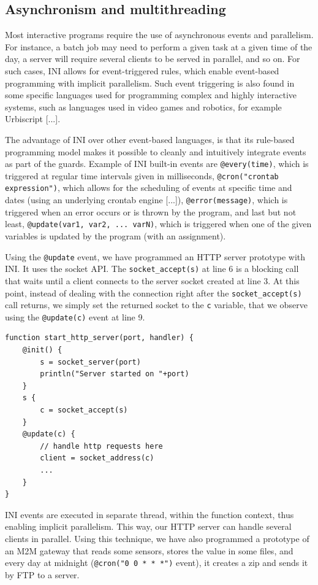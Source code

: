 \documentclass{sig-alternate}
\begin{document}
\subsection{Asynchronism and multithreading}

Most interactive programs require the use of asynchronous events and parallelism. For instance, a batch job may need to perform a given task at a given time of the day, a server will require several clients to be served in parallel, and so on. For such cases, INI allows for event-triggered rules, which enable event-based programming with implicit parallelism. Such event triggering is also found in some specific languages used for programming complex and highly interactive systems, such as languages used in video games and robotics, for example Urbiscript [...]. 

The advantage of INI over other event-based languages, is that its rule-based programming model makes it possible to cleanly and intuitively integrate events as part of the guards. Example of INI built-in events are \texttt{@every(time)}, which is triggered at regular time intervals given in milliseconds, \texttt{@cron("crontab expression")}, which allows for the scheduling of events at specific time and dates (using an underlying crontab engine [...]), \texttt{@error(message)}, which is triggered when an error occurs or is thrown by the program, and last but not least, \texttt{@update(var1, var2, ... varN)}, which is triggered when one of the given variables is updated by the program (with an assignment).

Using the \texttt{@update} event, we have programmed an HTTP server prototype with INI. It uses the socket API. The \texttt{socket\-\_accept(s)} at line 6 is a blocking call that waits until a client connects to the server socket created at line 3. At this point, instead of dealing with the connection right after the \texttt{socket\_accept(s)} call returns, we simply set the returned socket to the \texttt{c} variable, that we observe using the \texttt{@update(c)} event at line 9. 

\begin{lstlisting}
function start_http_server(port, handler) {
	@init() {
		s = socket_server(port)
		println("Server started on "+port)
	}
	s { 
		c = socket_accept(s)
	}
	@update(c) {
		// handle http requests here
		client = socket_address(c)
		...
	}	
}
\end{lstlisting}

INI events are executed in separate thread, within the function context, thus enabling implicit parallelism. This way, our HTTP server can handle several clients in parallel. Using this technique, we have also programmed a prototype of an M2M gateway that reads some sensors, stores the value in some files, and every day at midnight (\texttt{@cron("0 0 * * *")} event), it creates a zip and sends it by FTP to a server.
\end{document}
